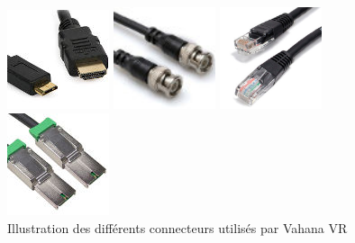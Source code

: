 \begin{figure}
  \centering
  \begin{minipage}{0.2\textwidth}
    \centering
    \includegraphics[width=3cm]{images/hdmi-cable.jpg}
  \end{minipage}%
  \hspace{0.03\textwidth}
  \begin{minipage}{0.2\textwidth}
    \centering
    \includegraphics[width=3cm]{images/sdi-cable.jpg}
  \end{minipage}%
  \hspace{0.03\textwidth}
  \begin{minipage}{0.2\textwidth}
    \centering
    \includegraphics[width=3cm]{images/ethernet-cable.jpg}
  \end{minipage}%
  \hspace{0.03\textwidth}
  \begin{minipage}{0.2\textwidth}
    \centering
    \includegraphics[width=3cm]{images/pcie-cable.jpg}
  \end{minipage}
  \caption{Illustration des différents connecteurs utilisés par Vahana VR}
\end{figure}


